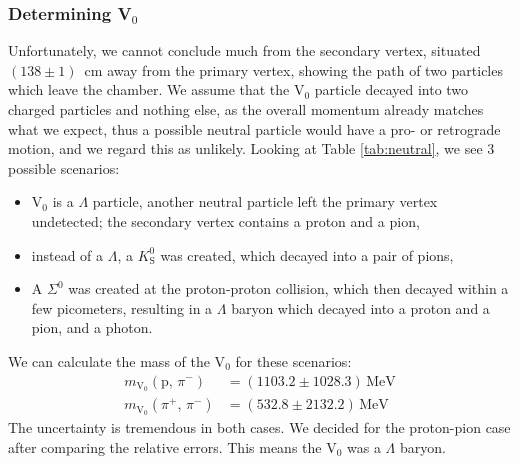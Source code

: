 \documentclass[twocolumn]{article}
\begin{document}
\subsubsection{Determining V$_0$}
Unfortunately, we cannot conclude much from the secondary vertex, situated $(138 \pm 1)$~cm away from the primary vertex, showing the path of two particles which leave the chamber. We assume that the V$_0$ particle decayed into two charged particles and nothing else, as the overall momentum already matches what we expect, thus a possible neutral particle would have a pro- or retrograde motion, and we regard this as unlikely. Looking at Table \ref{tab:neutral}, we see 3 possible scenarios:
\begin{itemize}
\item V$_0$ is a $\Lambda$ particle, another neutral particle left the primary vertex undetected; the secondary vertex contains a proton and a pion,
\item instead of a $\Lambda$, a $K^0_{\text{S}}$ was created, which decayed into a pair of pions,
\item A $\Sigma^0$ was created at the proton-proton collision, which then decayed within a few picometers, resulting in a $\Lambda$ baryon which decayed into a proton and a pion, and a photon.
\end{itemize}
We can calculate the mass of the V$_0$ for these scenarios:
\begin{align*}
m_{\text{V}_0} ( \text{p}, \, \pi^-) &= (1103.2 \pm 1028.3)\, \text{MeV}\\
m_{\text{V}_0} ( \pi^+, \, \pi^- ) &= (532.8 \pm 2132.2)\, \text{MeV}
\end{align*}
The uncertainty is tremendous in both cases. We decided for the proton-pion case after comparing the relative errors. This means the V$_0$ was a $\Lambda$ baryon.
\end{document}

